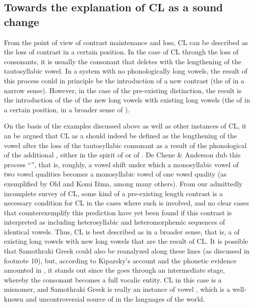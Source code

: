 \documentclass[output=paper,
modfonts
]{LSP/langsci}
\begin{document}
\subsection{Towards the explanation of CL as a sound change}

From the point of view of contrast maintenance and loss, CL can be
described as the loss of contrast in a certain position. In the case of
CL through the loss of consonants, it is usually the  consonant that
deletes with the lengthening of the tautosyllabic vowel. In a system
with no phonologically long vowels, the result of this
process could in principle be the introduction of a new 
contrast (the  of  in a narrow sense).
However, in the case of the pre-existing  distinction, the
result is the introduction of the  of the new long vowels with
existing long vowels (the  of  in a certain
position, in a broader sense of ).

On the basis of the examples discussed above as well as other instances
of CL, it an be argued that CL as a  should indeed be
defined as the lengthening of the vowel after the loss of the
tautosyllabic consonant as a result of the phonological  of
the additional , either in the spirit of \citet{deChene1979} or of \citet{kavitskaya2002}. De Chene \& Anderson \citeyearpar{deChene1979}
dub this process ``'', that is, roughly, a vowel shift
under which a monosyllabic vowel of two vowel qualities becomes a
monosyllabic vowel of one vowel quality (as exemplified by Old 
and Komi Ižma, among many others). From our admittedly incomplete survey
of CL, some kind of a pre-existing length contrast is a necessary
condition for CL in the cases where such  is involved, and no
clear cases that counterexemplify this prediction have yet been found if
this contrast is interpreted as including heterosyllabic and
heteromorphemic sequences of identical vowels. Thus, CL is best
described as  in a broader sense, that is, a  of
existing long vowels with new long vowels that are the result of CL. It
is possible that Samothraki Greek could also be reanalyzed along these
lines (as discussed in footnote 10), but, according to Kiparsky's \citeyearpar{kiparsky2011k}
account and the phonetic evidence amounted in \citet{katsika2015}, it stands out since the  goes through an
intermediate stage, whereby the consonant becomes a full vocalic entity.
CL in this case is a misnomer, and Samothraki Greek is really an
instance of vowel , which is a well-known and uncontroversial
source of  in the languages of the world.
\end{document}
